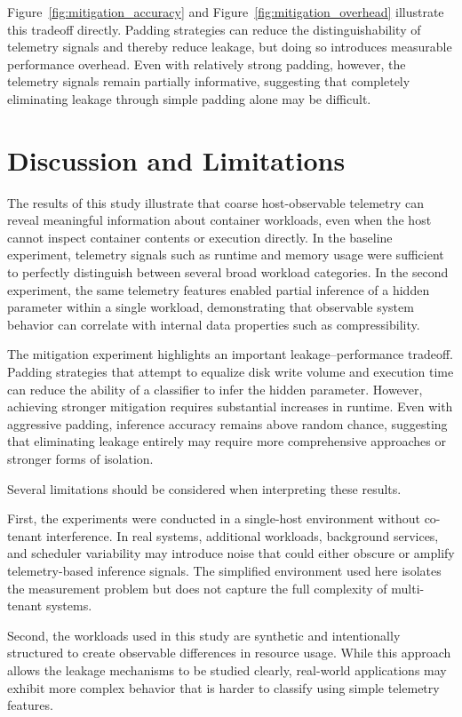 \documentclass[11pt]{article}
\begin{document}
Figure~\ref{fig:mitigation_accuracy} and Figure~\ref{fig:mitigation_overhead} illustrate this tradeoff directly. Padding strategies can reduce the distinguishability of telemetry signals and thereby reduce leakage, but doing so introduces measurable performance overhead. Even with relatively strong padding, however, the telemetry signals remain partially informative, suggesting that completely eliminating leakage through simple padding alone may be difficult.

\section{Discussion and Limitations}

The results of this study illustrate that coarse host-observable telemetry can reveal meaningful information about container workloads, even when the host cannot inspect container contents or execution directly. In the baseline experiment, telemetry signals such as runtime and memory usage were sufficient to perfectly distinguish between several broad workload categories. In the second experiment, the same telemetry features enabled partial inference of a hidden parameter within a single workload, demonstrating that observable system behavior can correlate with internal data properties such as compressibility.

The mitigation experiment highlights an important leakage--performance tradeoff. Padding strategies that attempt to equalize disk write volume and execution time can reduce the ability of a classifier to infer the hidden parameter. However, achieving stronger mitigation requires substantial increases in runtime. Even with aggressive padding, inference accuracy remains above random chance, suggesting that eliminating leakage entirely may require more comprehensive approaches or stronger forms of isolation.

Several limitations should be considered when interpreting these results.

First, the experiments were conducted in a single-host environment without co-tenant interference. In real systems, additional workloads, background services, and scheduler variability may introduce noise that could either obscure or amplify telemetry-based inference signals. The simplified environment used here isolates the measurement problem but does not capture the full complexity of multi-tenant systems.

Second, the workloads used in this study are synthetic and intentionally structured to create observable differences in resource usage. While this approach allows the leakage mechanisms to be studied clearly, real-world applications may exhibit more complex behavior that is harder to classify using simple telemetry features.
\end{document}

